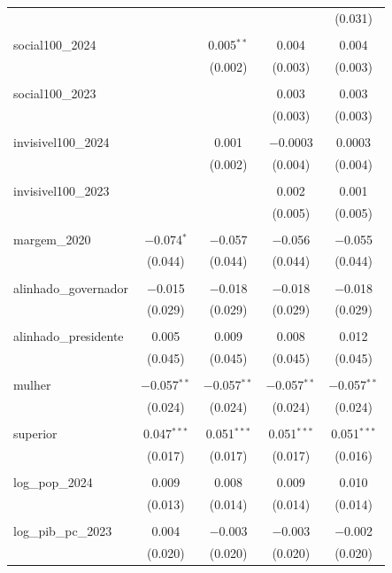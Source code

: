 \begin{table}[!htbp]
\begin{tabular}{@{\extracolsep{5pt}}lcccc}
  &  &  &  & (0.031) \\ 
  & & & & \\ 
 social100\_2024 &  & 0.005$^{**}$ & 0.004 & 0.004 \\ 
  &  & (0.002) & (0.003) & (0.003) \\ 
  & & & & \\ 
 social100\_2023 &  &  & 0.003 & 0.003 \\ 
  &  &  & (0.003) & (0.003) \\ 
  & & & & \\ 
 invisivel100\_2024 &  & 0.001 & $-$0.0003 & 0.0003 \\ 
  &  & (0.002) & (0.004) & (0.004) \\ 
  & & & & \\ 
 invisivel100\_2023 &  &  & 0.002 & 0.001 \\ 
  &  &  & (0.005) & (0.005) \\ 
  & & & & \\ 
 margem\_2020 & $-$0.074$^{*}$ & $-$0.057 & $-$0.056 & $-$0.055 \\ 
  & (0.044) & (0.044) & (0.044) & (0.044) \\ 
  & & & & \\ 
 alinhado\_governador & $-$0.015 & $-$0.018 & $-$0.018 & $-$0.018 \\ 
  & (0.029) & (0.029) & (0.029) & (0.029) \\ 
  & & & & \\ 
 alinhado\_presidente & 0.005 & 0.009 & 0.008 & 0.012 \\ 
  & (0.045) & (0.045) & (0.045) & (0.045) \\ 
  & & & & \\ 
 mulher & $-$0.057$^{**}$ & $-$0.057$^{**}$ & $-$0.057$^{**}$ & $-$0.057$^{**}$ \\ 
  & (0.024) & (0.024) & (0.024) & (0.024) \\ 
  & & & & \\ 
 superior & 0.047$^{***}$ & 0.051$^{***}$ & 0.051$^{***}$ & 0.051$^{***}$ \\ 
  & (0.017) & (0.017) & (0.017) & (0.016) \\ 
  & & & & \\ 
 log\_pop\_2024 & 0.009 & 0.008 & 0.009 & 0.010 \\ 
  & (0.013) & (0.014) & (0.014) & (0.014) \\ 
  & & & & \\ 
 log\_pib\_pc\_2023 & 0.004 & $-$0.003 & $-$0.003 & $-$0.002 \\ 
  & (0.020) & (0.020) & (0.020) & (0.020) \\ 

\end{tabular}
\end{table}
